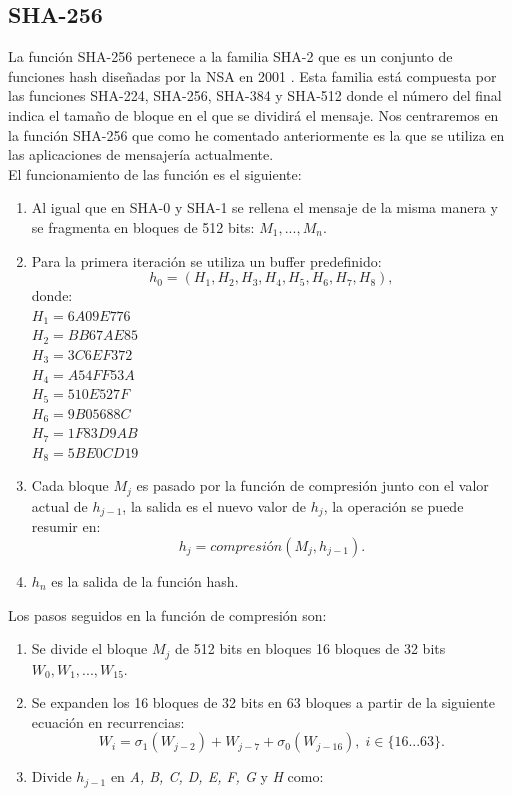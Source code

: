\begin{aligned*}
\subsection{SHA-256}
La función SHA-256 pertenece a la familia SHA-2 que es un conjunto de funciones hash diseñadas por la NSA en 2001 \cite{Penard2008}. Esta familia está compuesta por las funciones SHA-224, SHA-256, SHA-384 y SHA-512 donde el número del final indica el tamaño de bloque en el que se dividirá el mensaje. Nos centraremos en la función SHA-256 que como he comentado anteriormente es la que se utiliza en las aplicaciones de mensajería actualmente.\\
El funcionamiento de las función es el siguiente\cite{Function2016}:\\
\begin{enumerate}
	\item Al igual que en SHA-0 y SHA-1 se rellena el mensaje de la misma manera y se fragmenta en bloques de 512 bits: $M_1,...,M_n$.
	\item Para la primera iteración se utiliza un buffer predefinido:
	$$
		h_0=(H_1, H_2, H_3, H_4, H_5, H_6, H_7, H_8),
	$$
	donde:\\
	$H_1=6A09E776$\\
	$H_2=BB67AE85$\\
	$H_3=3C6EF372$\\
	$H_4=A54FF53A$\\
	$H_5=510E527F$\\
	$H_6=9B05688C$\\
	$H_7=1F83D9AB$\\
	$H_8=5BE0CD19$\\
	\item Cada bloque $M_j$ es pasado por la función de compresión junto con el valor actual de $h_{j-1}$, la salida es el nuevo valor de $h_j$, la operación se puede resumir en:
	$$
		h_j=compresión(M_j,h_{j-1}).
	$$
	\item $h_n$ es la salida de la función hash.
\end{enumerate}
Los pasos seguidos en la función de compresión son:
\begin{enumerate}
	\item Se divide el bloque $M_j$ de 512 bits en bloques 16 bloques de 32 bits $W_0,W_1,...,W_{15}$. 
	\item Se expanden los 16 bloques de 32 bits en 63 bloques a partir de la siguiente ecuación en recurrencias:
	$$
		W_i=\sigma_1(W_{j-2})+W_{j-7}+\sigma_0(W_{j-16}),\; i \in \{16...63\}.
	$$
	\item Divide $h_{j-1}$ en \emph{A, B, C, D, E, F, G} y \emph{H} como:

\end{enumerate}
\end{aligned*}
